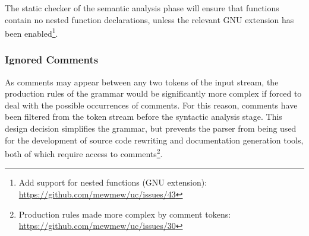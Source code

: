 The static checker of the semantic analysis phase will ensure that functions contain no nested function declarations, unless the relevant GNU extension has been enabled\footnote{Add support for nested functions (GNU extension): \url{https://github.com/mewmew/uc/issues/43}}.

\subsubsection{Ignored Comments}

As comments may appear between any two tokens of the input stream, the production rules of the grammar would be significantly more complex if forced to deal with the possible occurrences of comments. For this reason, comments have been filtered from the token stream before the syntactic analysis stage. This design decision simplifies the grammar, but prevents the parser from being used for the development of source code rewriting and documentation generation tools, both of which require access to comments\footnote{Production rules made more complex by comment tokens: \url{https://github.com/mewmew/uc/issues/30}}.
